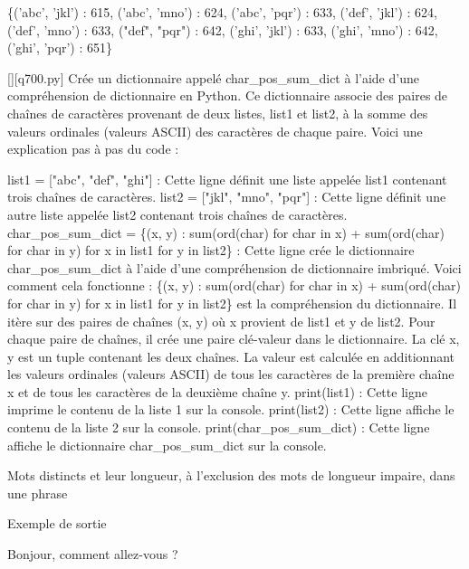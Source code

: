 \{('abc', 'jkl') : 615, ('abc', 'mno') : 624, ('abc', 'pqr') : 633, ('def', 'jkl') : 624, ('def', 'mno') : 633, ("def", "pqr") : 642, ('ghi', 'jkl') : 633, ('ghi', 'mno') : 642, ('ghi', 'pqr') : 651\}
        \par
        \begin{solution}
            \renewcommand{\nomfichier}{q700.py}
            \pythonfile{\chemincode \nomfichier}[][\nomfichier]
            Crée un dictionnaire appelé char\_pos\_sum\_dict à l'aide d'une compréhension de dictionnaire en Python. Ce dictionnaire associe des paires de chaînes de caractères provenant de deux listes, list1 et list2, à la somme des valeurs ordinales (valeurs ASCII) des caractères de chaque paire. Voici une explication pas à pas du code :

    list1 = ["abc", "def", "ghi"] : Cette ligne définit une liste appelée list1 contenant trois chaînes de caractères.
    list2 = ["jkl", "mno", "pqr"] : Cette ligne définit une autre liste appelée list2 contenant trois chaînes de caractères.
    char\_pos\_sum\_dict = \{(x, y) : sum(ord(char) for char in x) + sum(ord(char) for char in y) for x in list1 for y in list2\} : Cette ligne crée le dictionnaire char\_pos\_sum\_dict à l'aide d'une compréhension de dictionnaire imbriqué. Voici comment cela fonctionne :
        \{(x, y) : sum(ord(char) for char in x) + sum(ord(char) for char in y) for x in list1 for y in list2\} est la compréhension du dictionnaire. Il itère sur des paires de chaînes (x, y) où x provient de list1 et y de list2.
        Pour chaque paire de chaînes, il crée une paire clé-valeur dans le dictionnaire. La clé x, y est un tuple contenant les deux chaînes. La valeur est calculée en additionnant les valeurs ordinales (valeurs ASCII) de tous les caractères de la première chaîne x et de tous les caractères de la deuxième chaîne y.
    print(list1) : Cette ligne imprime le contenu de la liste 1 sur la console.
    print(list2) : Cette ligne affiche le contenu de la liste 2 sur la console.
    print(char\_pos\_sum\_dict) : Cette ligne affiche le dictionnaire char\_pos\_sum\_dict sur la console.
        \end{solution}
        

        \question
        Mots distincts et leur longueur, à l'exclusion des mots de longueur impaire, dans une phrase

Exemple de sortie

Bonjour, comment allez-vous ?

